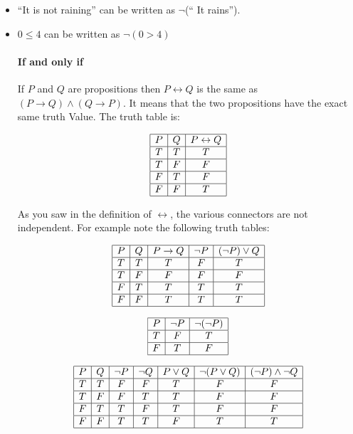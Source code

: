 \begin{itemize}
\item ``It is not raining'' can be written as $\neg$(`` It rains'').
\item $0\le 4$ can be  written as $\neg (0>4)$ 



\paragraph{\bf If and only if}

If $P$ and $Q$ are propositions then $P\leftrightarrow Q$ is the same as $(P\rightarrow Q) \land (Q\rightarrow P)$. It means that the two propositions have the exact same truth Value. The truth table is:

$$\begin{array}{|c|c|c|}\hline P & Q & P\leftrightarrow Q \\\hline T & T & T \\\hline T & F & F \\\hline F & T & F \\\hline F & F & T\\ \hline\end{array}$$


As you saw in the definition of $\leftrightarrow$, the various connectors are not independent. For example note the following truth tables:

$$\begin{array}{|c|c|c|c|c|}\hline P & Q & P\rightarrow Q & \neg P & (\neg P)\lor Q \\ \hline T & T & T &F &T\\\hline T & F & F &F &F \\\hline F & T & T &T &T \\\hline F & F & T &T&T\\ \hline\end{array}$$


$$\begin{array}{|c|c|c|}\hline P & \neg P & \neg (\neg P) \\\hline T & F & T \\\hline F & T & F \\\hline\end{array}$$

$$\begin{array}{|c|c|c|c|c|c|c|}\hline P & Q & \neg P & \neg Q & P\lor Q & \neg ( P \lor Q) & (\neg P)\land \neg Q \\ \hline T & T & F &F & T & F & F \\\hline T & F & F &T & T &F & F \\\hline F & T & T & F & T & F & F \\\hline F & F & T &T&F& T & T\\ \hline\end{array}$$



\end{itemize}
